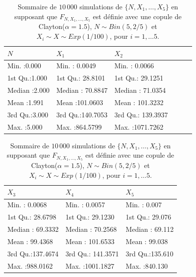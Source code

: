 \documentclass{article}
\begin{document}
		\begin{table}[H]
			\centering
			\begin{tabular}[width=\textwidth]{llllll}
				\hline
				       $N$ &       $X_1$ &       $X_2$ &             \\ 
				\hline
				 Min.   :0.000   & Min.   :  0.0049   & Min.   :   0.0066      \\ 
				 1st Qu.:1.000   & 1st Qu.: 28.8101   & 1st Qu.:  29.1251      \\ 
				 Median :2.000   & Median : 70.8847   & Median :  71.0354      \\ 
				 Mean   :1.991   & Mean   :101.0603   & Mean   : 101.3232      \\ 
				 3rd Qu.:3.000   & 3rd Qu.:140.7053   & 3rd Qu.: 139.3937      \\ 
				 Max.   :5.000   & Max.   :864.5799   & Max.   :1071.7262      \\ 
				\hline
			\end{tabular}
			\begin{tabular}[width=\textwidth]{lll}
				\hline
				       $X_3$ &       $X_4$ &       $X_5$ \\ 
				\hline
			 	 Min.   :  0.0068   & Min.   :   0.0057   & Min.   :  0.007   \\ 
				 1st Qu.: 28.6798   & 1st Qu.:  29.1230   & 1st Qu.: 29.076   \\ 
				 Median : 69.3332   & Median :  70.2568   & Median : 69.112   \\ 
				 Mean   : 99.4368   & Mean   : 101.6533   & Mean   : 99.038   \\ 
				 3rd Qu.:137.4674   & 3rd Qu.: 141.3571   & 3rd Qu.:135.610   \\ 
				 Max.   :988.0162   & Max.   :1001.1827   & Max.   :840.130   \\ 
				\hline
			\end{tabular}
		\caption[Sommaire des données simulées pour le scénario \ref{scenario_Clayton_Binom}]{Sommaire de $10\,000$ simulations de $\{N, X_1, \dots, X_5\}$ en supposant que $F_{N,X_1,\dots, X_5}$ est définie avec une copule de Clayton($\alpha=1.5$), $N \sim Bin(5, 2/5)$ et $X_i \sim X \sim Exp(1/100)$, pour $i=1,\dots 5$.}
		\label{tbl_sommaire_Clayton_Binom}
		\end{table}
	
\end{document}
